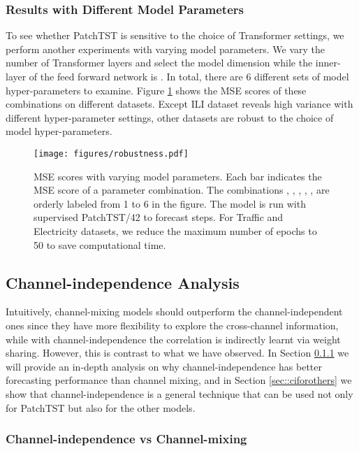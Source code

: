 \documentclass{article} \usepackage{iclr2023_conference,times}
\begin{document}
\subsubsection{Results with Different Model Parameters}

To see whether PatchTST is sensitive to the choice of Transformer settings, we perform another experiments with varying model parameters. We vary the number of Transformer layers  and select the model dimension  while the inner-layer of the feed forward network is . In total, there are 6 different sets of model hyper-parameters to examine. Figure \ref{fig::robustness} shows the MSE scores of these combinations on different datasets. Except ILI dataset reveals high variance with different hyper-parameter settings, other datasets are robust to the choice of model hyper-parameters. 


\begin{figure}[h]
\begin{center}
\texttt{[image: figures/robustness.pdf]}
\end{center}
\caption{MSE scores with varying model parameters. Each bar indicates the MSE score of a parameter combination. The combinations , , , , ,  are orderly labeled from 1 to 6 in the figure. The model is run with supervised PatchTST/42 to forecast  steps. For Traffic and Electricity datasets, we reduce the maximum number of epochs to 50 to save computational time.}
\label{fig::robustness}
\end{figure}


\subsection{Channel-independence Analysis}
\label{append::ci}

Intuitively, channel-mixing models should outperform the channel-independent ones since they have more flexibility to explore the cross-channel information, while with channel-independence the correlation is indirectly learnt via weight sharing. However, this is contrast to what we have observed. In Section \ref{sec::civsmix} we will provide an in-depth analysis on why channel-independence has better forecasting performance than channel mixing, and in Section \ref{sec::ciforothers} we show that channel-independence is a general technique that can be used not only for PatchTST but also for the other models. 


\subsubsection{Channel-independence vs Channel-mixing}
\label{sec::civsmix}
\end{document}
